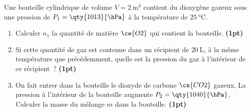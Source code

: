 Une bouteille cylindrique de volume $V=\qty{2}{\cubic\m}$ contient du dioxygène
gazeux sous une pression de $P_{1}=\qty{1013}{\hPa}$ à la température de
$\qty{25}{\degreeCelsius}$.

\begin{enumerate}
    \item Calculer $n_1$ la quantité de matière $\ce{O2}$ qui contient la
          bouteille.
          \textbf{(1pt)}
    \item Si cette quantité de gaz est contenue dans un récipient de
          $\qty{20}{\L}$, à la même température que précédemment, quelle est la
          pression du gaz à l'intérieur de ce récipient~?
          \textbf{(1pt)}
    \item On fait entrer dans la bouteille le dioxyde de carbone $\ce{CO2}$
          gazeux, La pression à l'intérieur de la bouteille augmente
          $P_{2}=\qty{1040}{\hPa}$. Calculer la masse du mélange $m$ dans la
          bouteille.
          \textbf{(1pt)}
\end{enumerate}

